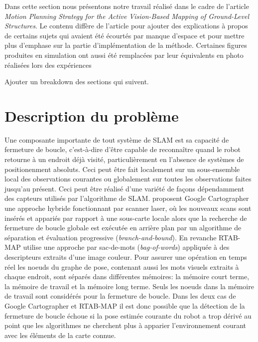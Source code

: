 \label{sec:ugv}

Dans cette section nous présentons notre travail réalisé dans le cadre de l'article \textit{Motion Planning Strategy for the Active Vision-Based Mapping of Ground-Level Structures}. Le contenu diffère de l'article pour ajouter des explications à propos de certains sujets qui avaient été écourtés par manque d'espace et pour mettre plus d'emphase sur la partie d'implémentation de la méthode. Certaines figures produites en simulation ont aussi été remplacées par leur équivalents en photo réalisées lors des expériences

\color{red}
Ajouter un breakdown des sections qui suivent.
\color{black}

\section{Description du problème} \label{sec:ugv_problem_description}
Une composante importante de tout système de SLAM est sa capacité de fermeture de boucle, c'est-à-dire d'être capable de reconnaître quand le robot retourne à un endroit déjà visité, particulièrement en l'absence de systèmes de positionenment absoluts. Ceci peut être fait localement sur un sous-ensemble local des observations courantes ou globalement sur toutes les observations faites jusqu'au présent. Ceci peut être réalisé d'une variété de façons dépendamment des capteurs utilisés par l'algorithme de SLAM. \citep{Hess2016} proposent Google Cartographer une approche hybride fonctionnant par scanner laser, où les nouveaux scans sont insérés et appariés par rapport à une sous-carte locale alors que la recherche de fermeture de boucle globale est exécutée en arrière plan par un algorithme de séparation et évaluation progressive (\textit{branch-and-bound}). En revanche RTAB-MAP \citep{Labbe2014} utilise une approche par sac-de-mots (\textit{bag-of-words}) appliquée à des descripteurs extraits d'une image couleur. Pour assurer une opération en temps réel les noeuds du graphe de pose, contenant aussi les mots visuels extraits à chaque endroit, sont séparés dans différentes mémoires: la mémoire court terme, la mémoire de travail et la mémoire long terme. Seuls les noeuds dans la mémoire de travail sont considérés pour la fermeture de boucle. Dans les deux cas de Google Cartographer et RTAB-MAP il est donc possible que la détection de la fermeture de boucle échoue si la pose estimée courante du robot a trop dérivé au point que les algorithmes ne cherchent plus à apparier l'environnement courant avec les éléments de la carte connue.

